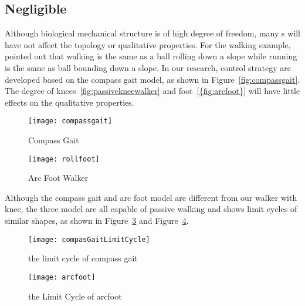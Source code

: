 {\subsection{Negligible \dof}
Although biological mechanical structure is of high degree of freedom, many \dof s will have not affect the topology or qualitative properties.
For the walking example, \citet{Raibert1986} pointed out that walking is the same as a ball rolling down a slope while running is the same as ball bounding down a slope.
In our research, control strategy are developed based on the compass gait model, as shown in Figure~\ref{fig:compassgait}.
The degree of knees~\ref{fig:passivekneewalker} and foot~\ref{{fig:arcfoot}} will have little effects on the qualitative properties.
\begin{figure}[!htbp]
  \begin{center}
      \texttt{[image: compassgait]}
    \caption{Compass Gait}
    \label{fig:}
\end{center}
\end{figure}



\begin{figure}[!htbp]
  \begin{center}
      \texttt{[image: rollfoot]}
    \caption{Arc Foot Walker}
    \label{fig:arcfoot}
\end{center}
\end{figure}






Although the compass gait and arc foot model are different from  our walker with knee, the three model are all capable of passive walking and shows limit cycles of similar shapes, as shown in Figure~\ref{fig:compassgaitlimitcycle} and Figure~\ref{fig:arcfootlimitcycle}.
\begin{figure}[!htbp]
  \begin{center}
      \texttt{[image: compasGaitLimitCycle]}
    \caption{the limit cycle of compass gait}
    \label{fig:compassgaitlimitcycle}
\end{center}
\end{figure}

\begin{figure}[!htbp]
  \begin{center}
      \texttt{[image: arcfoot]}
    \caption{the Limit Cycle of arcfoot}
    \label{fig:arcfootlimitcycle}
\end{center}
\end{figure}


}
